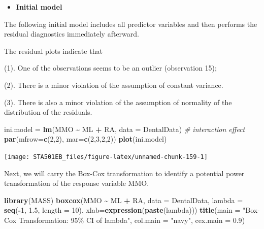 \documentclass[
]{book}
\newenvironment{Shaded}{\begin{snugshade}}{\end{snugshade}}
\newcommand{\AttributeTok}[1]{\textcolor[rgb]{0.13,0.29,0.53}{#1}}
\newcommand{\CommentTok}[1]{\textcolor[rgb]{0.56,0.35,0.01}{\textit{#1}}}
\newcommand{\DecValTok}[1]{\textcolor[rgb]{0.00,0.00,0.81}{#1}}
\newcommand{\FloatTok}[1]{\textcolor[rgb]{0.00,0.00,0.81}{#1}}
\newcommand{\FunctionTok}[1]{\textcolor[rgb]{0.13,0.29,0.53}{\textbf{#1}}}
\newcommand{\NormalTok}[1]{#1}
\newcommand{\OtherTok}[1]{\textcolor[rgb]{0.56,0.35,0.01}{#1}}
\newcommand{\SpecialCharTok}[1]{\textcolor[rgb]{0.81,0.36,0.00}{\textbf{#1}}}
\newcommand{\StringTok}[1]{\textcolor[rgb]{0.31,0.60,0.02}{#1}}
\providecommand{\tightlist}{%
  \setlength{\itemsep}{0pt}\setlength{\parskip}{0pt}}
\begin{document}
\begin{itemize}
\tightlist
\item
  \textbf{Initial model}
\end{itemize}

The following initial model includes all predictor variables and then performs the residual diagnostics immediately afterward.

The residual plots indicate that

(1). One of the observations seems to be an outlier (observation 15);

(2). There is a minor violation of the assumption of constant variance.

(3). There is also a minor violation of the assumption of normality of the distribution of the residuals.

\begin{Shaded}
\begin{Highlighting}[]
\NormalTok{ini.model }\OtherTok{=} \FunctionTok{lm}\NormalTok{(MMO }\SpecialCharTok{\textasciitilde{}}\NormalTok{ ML }\SpecialCharTok{+}\NormalTok{ RA, }\AttributeTok{data =}\NormalTok{ DentalData)   }\CommentTok{\#  interaction effect}
\FunctionTok{par}\NormalTok{(}\AttributeTok{mfrow=}\FunctionTok{c}\NormalTok{(}\DecValTok{2}\NormalTok{,}\DecValTok{2}\NormalTok{), }\AttributeTok{mar=}\FunctionTok{c}\NormalTok{(}\DecValTok{2}\NormalTok{,}\DecValTok{3}\NormalTok{,}\DecValTok{2}\NormalTok{,}\DecValTok{2}\NormalTok{))}
\FunctionTok{plot}\NormalTok{(ini.model)}
\end{Highlighting}
\end{Shaded}

\begin{center}\texttt{[image: STA501EB\_files/figure-latex/unnamed-chunk-159-1]} \end{center}

Next, we will carry the Box-Cox transformation to identify a potential power transformation of the response variable MMO.

\begin{Shaded}
\begin{Highlighting}[]
\FunctionTok{library}\NormalTok{(MASS)}
\FunctionTok{boxcox}\NormalTok{(MMO }\SpecialCharTok{\textasciitilde{}}\NormalTok{ ML }\SpecialCharTok{+}\NormalTok{ RA, }
       \AttributeTok{data =}\NormalTok{ DentalData, }
       \AttributeTok{lambda =} \FunctionTok{seq}\NormalTok{(}\SpecialCharTok{{-}}\DecValTok{1}\NormalTok{, }\FloatTok{1.5}\NormalTok{, }\AttributeTok{length =} \DecValTok{10}\NormalTok{), }
       \AttributeTok{xlab=}\FunctionTok{expression}\NormalTok{(}\FunctionTok{paste}\NormalTok{(lambda)))}
\FunctionTok{title}\NormalTok{(}\AttributeTok{main =} \StringTok{"Box{-}Cox Transformation: 95\% CI of lambda"}\NormalTok{,}
      \AttributeTok{col.main =} \StringTok{"navy"}\NormalTok{, }\AttributeTok{cex.main =} \FloatTok{0.9}\NormalTok{)}
\end{Highlighting}
\end{Shaded}
\end{document}
